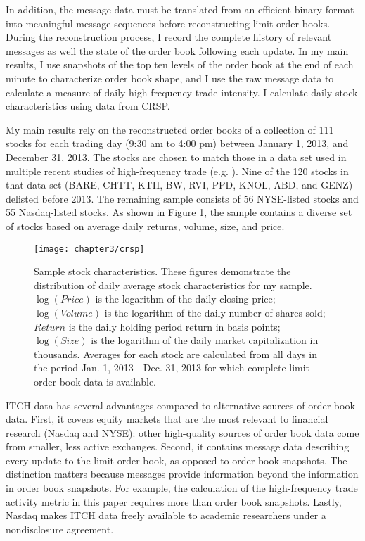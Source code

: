 	In addition, the message data must be translated from an efficient binary format into meaningful message sequences before reconstructing limit order books. During the reconstruction process, I record the complete history of relevant messages as well the state of the order book following each update. In my main results, I use snapshots of the top ten levels of the order book at the end of each minute to characterize order book shape, and I use the raw message data to calculate a measure of daily high-frequency trade intensity. I calculate daily stock characteristics using data from CRSP.

	My main results rely on the reconstructed order books of a collection of 111 stocks for each trading day (9:30 am to 4:00 pm) between January 1, 2013, and December 31, 2013. The stocks are chosen to match those in a data set used in multiple recent studies of high-frequency trade (e.g. \citet{Brogaard2014}). Nine of the 120 stocks in that data set (BARE, CHTT, KTII, BW, RVI, PPD, KNOL, ABD, and GENZ) delisted before 2013. The remaining sample consists of 56 NYSE-listed stocks and 55 Nasdaq-listed stocks. As shown in Figure \ref{fig:crsp}, the sample contains a diverse set of stocks based on average daily returns, volume, size, and price.


	\begin{figure}[p]
		\small
		\linespread{1}
		\centering
		\texttt{[image: chapter3/crsp]}
		\captionsetup{skip=-20pt, position=below, font=footnotesize, justification=justified, width=\linewidth}
		\caption[Sample stock characteristics]{Sample stock characteristics. These figures demonstrate the distribution of daily average stock characteristics for my sample. $\log(Price)$ is the logarithm of the daily closing price; $\log(Volume)$ is the logarithm of the daily number of shares sold; $Return$ is the daily holding period return in basis points; $\log(Size)$ is the logarithm of the daily market capitalization in thousands. Averages for each stock  are calculated from all days in the period Jan. 1, 2013 - Dec. 31, 2013 for which complete limit order book data is available.}
		\label{fig:crsp}
	\end{figure}


	ITCH data has several advantages compared to alternative sources of order book data. First, it covers equity markets that are the most relevant to financial research (Nasdaq and NYSE): other high-quality sources of order book data come from smaller, less active exchanges. Second, it contains message data describing every update to the limit order book, as opposed to order book snapshots. The distinction matters because messages provide information beyond the information in order book snapshots. For example, the calculation of the high-frequency trade activity metric in this paper requires more than order book snapshots. Lastly, Nasdaq makes ITCH data freely available to academic researchers under a nondisclosure agreement.

